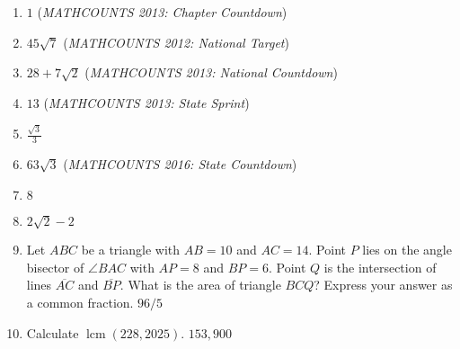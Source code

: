 \documentclass{article}
\begin{document}
\begin{enumerate}
\item $1$ (\emph{MATHCOUNTS 2013: Chapter Countdown})\vspace{1cm}
\item $45\sqrt{7}$ (\emph{MATHCOUNTS 2012: National Target})\vspace{1cm}
\item $28 + 7\sqrt{2}$ (\emph{MATHCOUNTS 2013: National Countdown})\vspace{1cm}
\item $13$ (\emph{MATHCOUNTS 2013: State Sprint}) \vspace{1cm}
\item $\frac{\sqrt{3}}{3}$\vspace{1cm}
\item $63\sqrt{3}$ (\emph{MATHCOUNTS 2016: State Countdown})\vspace{1cm}
\item $8$\vspace{1cm}
\item $2\sqrt{2} - 2$\vspace{1cm}
\item Let $ABC$ be a triangle with $AB = 10$ and $AC = 14$. Point $P$ lies on the angle bisector of $\angle BAC$ with $AP = 8$ and $BP = 6$. Point $Q$ is the intersection of lines $\overline{AC}$ and $\overline{BP}$. What is the area of triangle $BCQ$? Express your answer as a common fraction. $\boxed{96/5}$
\vspace{1cm}
\item Calculate $\operatorname{lcm}(228,2025)$. $\boxed{153{,}900}$
\end{enumerate}
\end{document}
